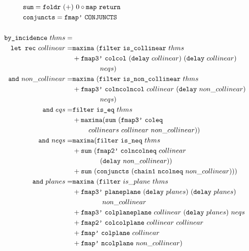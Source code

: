 \begin{figure}
\begin{align*}
&\hspace{-2.55cm}\code{sum} = \code{foldr}\ (+)\  0\circ \code{map}\ \code{return}\\
&\hspace{-2.55cm}\code{conjuncts} = \code{fmap'}\ \code{CONJUNCTS}\\\\
\code{by\_incidence}\ thms = \\
\quad \code{let rec}\ collinear =& \code{maxima}\ (\code{filter}\ \code{is\_collinear}\ thms\\
& + \code{fmap3'}\ \code{colcol}\ (\code{delay}\ collinear)\ (\code{delay}\ collinear)\\
&\qquad\qquad neqs)\\
\code{and}\ non\_collinear =& \code{maxima}\ (\code{filter}\ \code{is\_non\_collinear}\ thms\\
&+ \code{fmap3'}\ \code{colncolncol}\ collinear\ (\code{delay}\ non\_collinear)\\
&\qquad\qquad neqs)\\
\code{and}\ eqs =& \code{filter}\ \code{is\_eq}\ thms\\
&+ \code{maxima} (\code{sum}\ (\code{fmap3'}\ \code{coleq}\\
&\qquad\ collinears\ collinear\ non\_collinear))\\
\code{and}\ neqs =& \code{maxima} (\code{filter}\ \code{is\_neq}\ thms\\
&+ \code{sum}\ (\code{fmap2'}\ \code{colncolneq}\ collinear\\
&\qquad\qquad (\code{delay}\ non\_collinear))\\
&+ \code{sum}\ (\code{conjuncts}\ (\code{chain1}\ \code{ncolneq}\ non\_collinear)))\\
\code{and}\ planes =& \code{maxima}\ (\code{filter}\ is\_plane\ thms\\
& + \code{fmap3'}\ \code{planeplane}\ (\code{delay}\ planes)\ (\code{delay}\ planes)\\
&\qquad\qquad\ non\_collinear\\
& + \code{fmap3'}\ \code{colplaneplane}\ collinear\ (\code{delay}\ planes)\ neqs\\
&+ \code{fmap2'}\ \code{colcolplane}\ collinear\ collinear\\
&+ \code{fmap'}\ \code{colplane}\ collinear\\
&+ \code{fmap'}\ \code{ncolplane}\ non\_collinear)\\

\end{align*}
\end{figure}
